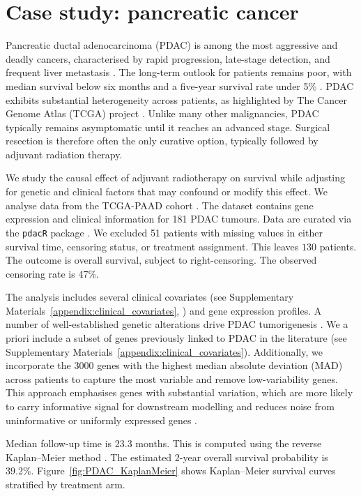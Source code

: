 \color{black}
\section{Case study: pancreatic cancer}\label{section:PDAC}

Pancreatic ductal adenocarcinoma (PDAC) is among the most aggressive and deadly cancers, characterised by rapid progression, late-stage detection, and  frequent liver metastasis \citep{Pereira2019Metastasis}. 
The long-term outlook for patients remains poor, with median survival below six months and a five-year survival rate under 5\% \citep{kamisawa2016pancreatic, li2019angiogenesis}. 
PDAC exhibits substantial heterogeneity across patients, as highlighted by The Cancer Genome Atlas (TCGA) project \citep{Sidaway2017TCGA}.
Unlike many other malignancies, PDAC typically remains asymptomatic until it reaches an advanced stage. 
Surgical resection is therefore often the only curative option, typically followed by adjuvant radiation therapy. 

We study the causal effect of adjuvant radiotherapy on survival while adjusting for genetic and clinical factors that may confound or modify this effect.
We analyse data from the TCGA-PAAD cohort \citep{Sidaway2017TCGA}.
The dataset contains gene expression and clinical information for 181 PDAC tumours.
Data are curated via the \texttt{pdacR} package \citep{TorreHealy2023pdacR}.
We excluded 51 patients with missing values in either survival time, censoring status, or treatment assignment.
This leaves $ 130$ patients.
The outcome is overall survival, subject to right-censoring. 
The observed censoring rate  is 47\%.

The analysis includes several clinical covariates (see Supplementary Materials~\ref{appendix:clinical_covariates}, \citealp{supplement}) and gene expression profiles. 
A number of well-established genetic alterations drive PDAC tumorigenesis \citep{Stefanoudakis2024}.
We a priori include a subset of genes previously linked to PDAC in the literature (see Supplementary Materials~\ref{appendix:clinical_covariates}).
Additionally, we incorporate the 3000 genes with the highest median absolute deviation (MAD) across patients to capture the most variable and remove low-variability genes.
This approach emphasises genes with substantial variation, which are more likely to carry informative signal for downstream modelling and reduces noise from uninformative or uniformly expressed genes \citep{Hackstadt2009, Zhang2018}.


Median follow-up time is 23.3 months.
This is computed using the reverse Kaplan--Meier method \citep{Schemper1996}.
The estimated 2-year overall survival probability is 39.2\%.  
Figure~\ref{fig:PDAC_KaplanMeier} shows Kaplan--Meier survival curves stratified by treatment arm.

